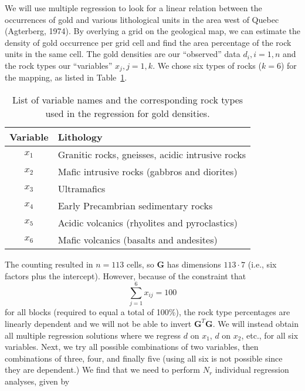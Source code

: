 \begin{example}	
We will use multiple regression to look for a linear relation between the occurrences of gold 
and various lithological units in the area west of Quebec (Agterberg, 1974).  By overlying a grid on the geological 
map, we can estimate the density of gold occurrence per grid cell and find the area percentage of 
the rock units in the same cell.  The gold densities are our ``observed'' data $d_i, i=1,n$ and the rock types 
our ``variables'' $x_j, j = 1,k$.  We chose six types of rocks ($k=6$) for the mapping, as listed in Table~\ref{tbl:rocks}.
\begin{table}[H]
\center
\begin{tabular}{|c|l|} \hline
\bf{Variable} & 	\bf{Lithology} \\ \hline
$x_1$ & 	Granitic rocks, gneisses, acidic intrusive rocks \\ \hline
$x_2$ & 	Mafic intrusive rocks (gabbros and diorites)\\ \hline
$x_3$ &		Ultramafics\\ \hline
$x_4$ & 	Early Precambrian sedimentary rocks\\ \hline
$x_5$ &  	Acidic volcanics (rhyolites and pyroclastics)\\ \hline
$x_6$ & 	Mafic volcanics (basalts and andesites)\\ \hline
\end{tabular}
\caption{List of variable names and the corresponding rock types used in the regression for gold densities.}
\label{tbl:rocks}
\end{table}
The counting resulted in $n = 113$ cells, so $\mathbf{G}$ has dimensions $113 \cdot 7$ (i.e., six factors plus the intercept).  However, 
because of the constraint that
\begin{equation}
\sum^6_{j=1} x_{ij} = 100
\end{equation}	 
for all blocks (required to equal a total of 100\%), the rock type percentages are linearly dependent 
and we will not be able to invert $\mathbf{G}^T\mathbf{G}$.  We will instead obtain all multiple regression 
solutions where we regress $d$ on $x_1$, $d$ on $x_2$, etc., for all six variables.  Next, we try all possible 
combinations of two variables, then combinations of three, four, and finally five (using all six is not possible
since they are dependent.)  We find that we need to perform $N_r$ individual regression analyses, given by

\end{example}
